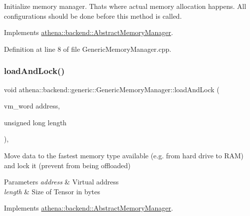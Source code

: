 Initialize memory manager. That\textquotesingle{}s where actual memory allocation happens. All configurations should be done before this method is called. 

Implements \mbox{\hyperlink{classathena_1_1backend_1_1_abstract_memory_manager}{athena\+::backend\+::\+Abstract\+Memory\+Manager}}.



Definition at line 8 of file Generic\+Memory\+Manager.\+cpp.

\mbox{\label{classathena_1_1backend_1_1generic_1_1_generic_memory_manager_aa7fce5a6cbd9c4f5ad1868735e4546a8}} 
\subsubsection{\texorpdfstring{load\+And\+Lock()}{loadAndLock()}\hspace{0.1cm}{\footnotesize\ttfamily [1/4]}}
{\footnotesize\ttfamily void athena\+::backend\+::generic\+::\+Generic\+Memory\+Manager\+::load\+And\+Lock (\begin{DoxyParamCaption}\item[{vm\+\_\+word}]{address,  }\item[{unsigned long}]{length }\end{DoxyParamCaption})\hspace{0.3cm}{\ttfamily [override]}, {\ttfamily [virtual]}}

Move data to the fastest memory type available (e.\+g. from hard drive to R\+AM) and lock it (prevent from being offloaded) 
\begin{DoxyParams}{Parameters}
{\em address} & Virtual address \\
\hline
{\em length} & Size of Tensor in bytes \\
\hline
\end{DoxyParams}


Implements \mbox{\hyperlink{classathena_1_1backend_1_1_abstract_memory_manager_a9fe52e4020802d6f526fba06adce8407}{athena\+::backend\+::\+Abstract\+Memory\+Manager}}.



